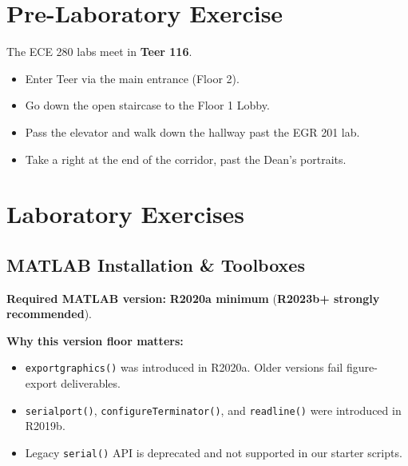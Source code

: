 \documentclass[12pt]{article}
\begin{document}
\section{Pre-Laboratory Exercise}
The ECE 280 labs meet in \textbf{Teer 116}.
\begin{itemize}
\item Enter Teer via the main entrance (Floor 2).
\item Go down the open staircase to the Floor 1 Lobby.
\item Pass the elevator and walk down the hallway past the EGR 201 lab.
\item Take a right at the end of the corridor, past the Dean's portraits.
\end{itemize}


\section{Laboratory Exercises}

\subsection{MATLAB Installation \& Toolboxes}
\textbf{Required MATLAB version:} \textbf{R2020a minimum} (\textbf{R2023b+ strongly recommended}).

\textbf{Why this version floor matters:}
\begin{itemize}
    \item \texttt{exportgraphics()} was introduced in R2020a. Older versions fail figure-export deliverables.
    \item \texttt{serialport()}, \texttt{configureTerminator()}, and \texttt{readline()} were introduced in R2019b.
    \item Legacy \texttt{serial()} API is deprecated and not supported in our starter scripts.
\end{itemize}
\end{document}
